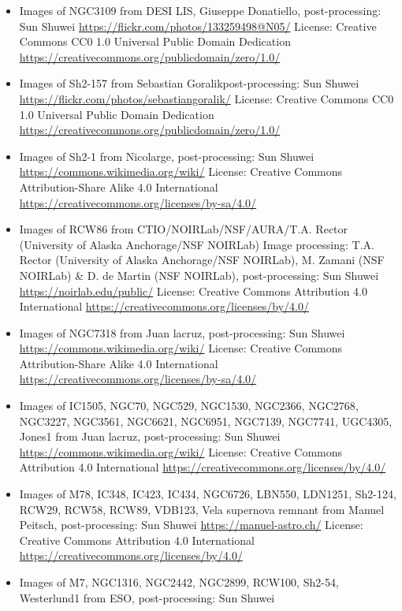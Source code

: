 \begin{itemize}
	 License: Creative Commons CC0 1.0 Universal Public Domain Dedication \url{https://creativecommons.org/publicdomain/zero/1.0/}
\item Images of NGC3109
	 from DESI LIS, Giuseppe Donatiello, post-processing: Sun Shuwei
	 \url{https://flickr.com/photos/133259498@N05/}
	 License: Creative Commons CC0 1.0 Universal Public Domain Dedication \url{https://creativecommons.org/publicdomain/zero/1.0/}
\item Images of Sh2-157
	 from Sebastian Goralikpost-processing: Sun Shuwei
	 \url{https://flickr.com/photos/sebastiangoralik/}
	 License: Creative Commons CC0 1.0 Universal Public Domain Dedication \url{https://creativecommons.org/publicdomain/zero/1.0/}
\item Images of Sh2-1
	 from Nicolarge, post-processing: Sun Shuwei
	 \url{https://commons.wikimedia.org/wiki/}
	 License: Creative Commons Attribution-Share Alike 4.0 International \url{https://creativecommons.org/licenses/by-sa/4.0/} 
\item Images of RCW86
	 from CTIO/NOIRLab/NSF/AURA/T.A. Rector (University of Alaska Anchorage/NSF NOIRLab) Image processing: T.A. Rector (University of Alaska Anchorage/NSF NOIRLab), M. Zamani (NSF NOIRLab) \& D. de Martin (NSF NOIRLab), post-processing: Sun Shuwei
	 \url{https://noirlab.edu/public/}
	 License: Creative Commons Attribution 4.0 International \url{https://creativecommons.org/licenses/by/4.0/}
\item Images of NGC7318
	 from Juan lacruz, post-processing: Sun Shuwei
	 \url{https://commons.wikimedia.org/wiki/}
	 License: Creative Commons Attribution-Share Alike 4.0 International \url{https://creativecommons.org/licenses/by-sa/4.0/} 
\item Images of IC1505, NGC70, NGC529, NGC1530, NGC2366, NGC2768, NGC3227, NGC3561,
	 NGC6621, NGC6951, NGC7139, NGC7741, UGC4305, Jones1
	 from Juan lacruz, post-processing: Sun Shuwei
	 \url{https://commons.wikimedia.org/wiki/}
	 License: Creative Commons Attribution 4.0 International \url{https://creativecommons.org/licenses/by/4.0/}
\item Images of M78, IC348, IC423, IC434, NGC6726, LBN550, LDN1251, Sh2-124, RCW29,
	 RCW58, RCW89, VDB123, Vela supernova remnant
	 from Manuel Peitsch, post-processing: Sun Shuwei
	 \url{https://manuel-astro.ch/}
	 License: Creative Commons Attribution 4.0 International \url{https://creativecommons.org/licenses/by/4.0/}
\item Images of M7, NGC1316, NGC2442, NGC2899, RCW100, Sh2-54, Westerlund1
	 from ESO, post-processing: Sun Shuwei

\end{itemize}
